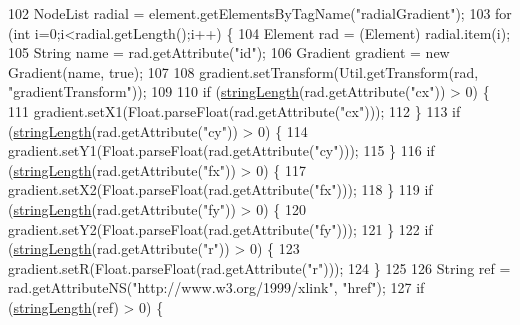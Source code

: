 \begin{DoxyCode}
102         NodeList radial = element.getElementsByTagName(\textcolor{stringliteral}{"radialGradient"});
103         \textcolor{keywordflow}{for} (\textcolor{keywordtype}{int} i=0;i<radial.getLength();i++) \{
104             Element rad = (Element) radial.item(i);
105             String name = rad.getAttribute(\textcolor{stringliteral}{"id"});
106             Gradient gradient = \textcolor{keyword}{new} Gradient(name, \textcolor{keyword}{true});
107             
108             gradient.setTransform(Util.getTransform(rad, \textcolor{stringliteral}{"gradientTransform"}));
109             
110             \textcolor{keywordflow}{if} (\mbox{\hyperlink{classorg_1_1newdawn_1_1slick_1_1svg_1_1inkscape_1_1_defs_processor_ab7a770c192ded7ccb0655791369c2475}{stringLength}}(rad.getAttribute(\textcolor{stringliteral}{"cx"})) > 0) \{
111                 gradient.setX1(Float.parseFloat(rad.getAttribute(\textcolor{stringliteral}{"cx"})));
112             \}
113             \textcolor{keywordflow}{if} (\mbox{\hyperlink{classorg_1_1newdawn_1_1slick_1_1svg_1_1inkscape_1_1_defs_processor_ab7a770c192ded7ccb0655791369c2475}{stringLength}}(rad.getAttribute(\textcolor{stringliteral}{"cy"})) > 0) \{
114                 gradient.setY1(Float.parseFloat(rad.getAttribute(\textcolor{stringliteral}{"cy"})));
115             \}
116             \textcolor{keywordflow}{if} (\mbox{\hyperlink{classorg_1_1newdawn_1_1slick_1_1svg_1_1inkscape_1_1_defs_processor_ab7a770c192ded7ccb0655791369c2475}{stringLength}}(rad.getAttribute(\textcolor{stringliteral}{"fx"})) > 0) \{
117                 gradient.setX2(Float.parseFloat(rad.getAttribute(\textcolor{stringliteral}{"fx"})));
118             \}
119             \textcolor{keywordflow}{if} (\mbox{\hyperlink{classorg_1_1newdawn_1_1slick_1_1svg_1_1inkscape_1_1_defs_processor_ab7a770c192ded7ccb0655791369c2475}{stringLength}}(rad.getAttribute(\textcolor{stringliteral}{"fy"})) > 0) \{
120                 gradient.setY2(Float.parseFloat(rad.getAttribute(\textcolor{stringliteral}{"fy"})));
121             \}
122             \textcolor{keywordflow}{if} (\mbox{\hyperlink{classorg_1_1newdawn_1_1slick_1_1svg_1_1inkscape_1_1_defs_processor_ab7a770c192ded7ccb0655791369c2475}{stringLength}}(rad.getAttribute(\textcolor{stringliteral}{"r"})) > 0) \{
123                 gradient.setR(Float.parseFloat(rad.getAttribute(\textcolor{stringliteral}{"r"})));
124             \}
125             
126             String ref = rad.getAttributeNS(\textcolor{stringliteral}{"http://www.w3.org/1999/xlink"}, \textcolor{stringliteral}{"href"});
127             \textcolor{keywordflow}{if} (\mbox{\hyperlink{classorg_1_1newdawn_1_1slick_1_1svg_1_1inkscape_1_1_defs_processor_ab7a770c192ded7ccb0655791369c2475}{stringLength}}(ref) > 0) \{

\end{DoxyCode}
